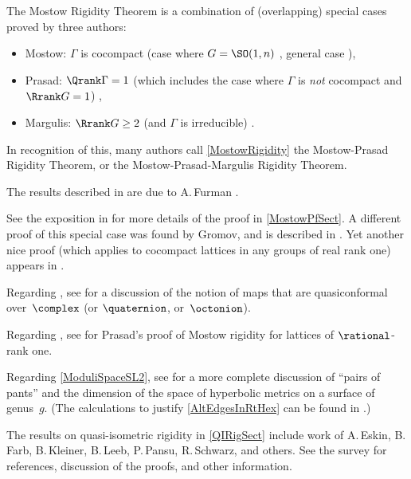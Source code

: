 \begin{notes}

The Mostow Rigidity Theorem  is a combination of (overlapping) special cases proved by three authors:
	\begin{itemize}
	\item Mostow: $\Gamma$ is cocompact
		(case where $G = \SO(1,n)$ \cite{Mostow-QIhyperbolic},
		 general case \cite{MostowRigidity}),
	\item Prasad: $\Qrank \Gamma = 1$ (which includes the case where $\Gamma$ is \emph{not} cocompact and $\Rrank G = 1$) \cite{PrasadMostowRig},
	\item Margulis: $\Rrank G \ge 2$ (and $\Gamma$ is irreducible) .
	\end{itemize}
In recognition of this, many authors call \cref{MostowRigidity} the 
	Mostow-Prasad Rigidity Theorem, 
or the Mostow-Prasad-Margulis Rigidity Theorem. 

The results described in  are due to A.\,Furman \cite{Furman-MostowMargulisRigidity}.

See the exposition in \cite[\S5.9, pp.~106--112]{Thurston-GeomTop3Mflds} for more details of the proof in \cref{MostowPfSect}.  A different proof of this special case was found by Gromov, and is described in \cite[\S6.3, pp.~129--130]{Thurston-GeomTop3Mflds}. Yet another nice proof (which applies to cocompact lattices in any groups of real rank one) appears in \cite[\S5.2]{BessonCourtoisGallot-MinEntropy}.

Regarding , see \cite[\S21, esp.\ (21,18)]{MostowRigidity} for a discussion of the notion of maps that are quasiconformal over~$\complex$ (or $\quaternion$, or~$\octonion$).

Regarding , see \cite{PrasadMostowRig} for Prasad's proof of Mostow rigidity for lattices of $\rational$-rank one.

Regarding \cref{ModuliSpaceSL2}, see \cite[Thm.~5.3.5]{Thurston-GeomTop3Mflds} for a more complete discussion of ``pairs of pants'' and the dimension of the space of hyperbolic metrics on a surface of genus~$g$. (The calculations to justify \cref{AltEdgesInRtHex} can be found in \cite[\S2.6]{Thurston-GeomTop3Mflds}.)

The results on quasi-isometric rigidity in \cref{QIRigSect} include work of A.\,Eskin, B.\,Farb, B.\,Kleiner, B.\,Leeb, P.\,Pansu, R.\,Schwarz, and others. See the survey \cite{FarbQISurvey} for references, discussion of the proofs, and other information.

\end{notes}





